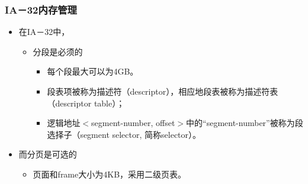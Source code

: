 \documentclass[CJKutf8,xcolor=pdftex,dvipsnames,table]{beamer}
\begin{document}
\begin{CJK*}{UTF8}{song}
  \begin{frame}
  \frametitle{IA－32内存管理} \pause
  \begin{itemize}
  \item{在IA－32中，} \pause
    \begin{itemize}
    \item{分段是必须的} \pause
      \begin{itemize}
      \item{每个段最大可以为4GB。} \pause
      \item{段表项被称为描述符（descriptor），相应地段表被称为描述符表（descriptor table）；} \pause
      \item{逻辑地址$<$segment-number, offset$>$中的“segment-number”被称为段选择子（segment selector, 简称selector）。} \pause
      \end{itemize}
    \end{itemize}
  \item{而分页是可选的} \pause
    \begin{itemize}
    \item{页面和frame大小为4KB，采用二级页表。}
    \end{itemize}
  \end{itemize}
  \end{frame}
  

\end{CJK*}
\end{document}
